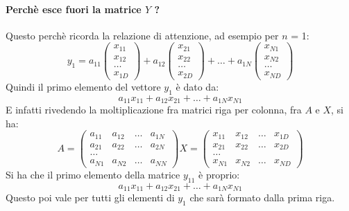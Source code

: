 \paragraph{Perchè esce fuori la matrice $Y$ ?}
Questo perchè ricorda la relazione di attenzione, ad esempio per $n$ = 1:
\begin{equation}
    y_1 = a_{11} \begin{pmatrix} x_{11} \\ x_{12} \\ \dots \\ x_{1D} \end{pmatrix} + a_{12} \begin{pmatrix} x_{21} \\ x_{22} \\ \dots \\ x_{2D} \end{pmatrix} + \dots + a_{1N} \begin{pmatrix} x_{N1} \\ x_{N2} \\ \dots \\ x_{ND} \end{pmatrix} 
\end{equation} 
Quindi il primo elemento del vettore $y_1$ è dato da:
\begin{equation}
    a_{11} x_{11} + a_{12} x_{21} + \dots + a_{1N} x_{N1}
\end{equation}
E infatti rivedendo la moltiplicazione fra matrici riga per colonna, fra $A$ e $X$, si ha:
\begin{equation}
    A = 
    \begin{pmatrix}
    a_{11} & a_{12} & \dots & a_{1N} \\
    a_{21} & a_{22} & \dots & a_{2N} \\
    \dots  \\
    a_{N1} & a_{N2} & \dots & a_{NN} 
    \end{pmatrix}
    X = 
    \begin{pmatrix}
    x_{11} & x_{12} & \dots & x_{1D} \\
    x_{21} & x_{22} & \dots & x_{2D} \\
    \dots \\
    x_{N1} & x_{N2} & \dots & x_{ND} 
    \end{pmatrix}
\end{equation}
Si ha che il primo elemento della matrice $y_{11}$ è proprio:
\begin{equation}
    a_{11} x_{11} + a_{12} x_{21} + \dots + a_{1N} x_{N1}
\end{equation}
Questo poi vale per tutti gli elementi di $y_1$ che sarà formato dalla prima riga.



